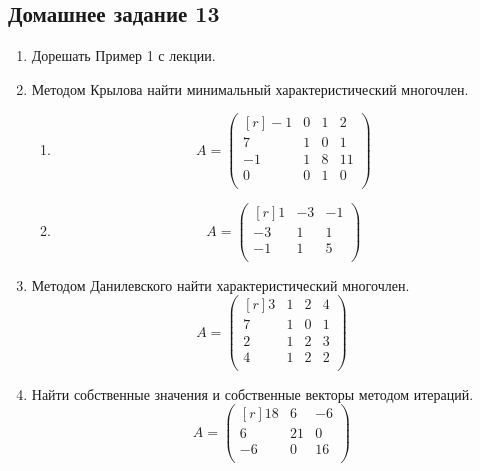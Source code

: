 \subsection{Домашнее задание 13}\begin{enumerate}
    \item Дорешать Пример 1 с лекции.
    \item Методом Крылова найти минимальный характеристический многочлен.
    \begin{enumerate}
        \item \[A = \begin{pmatrix}[r]
        -1 & 0 & 1 & 2\\
        7 & 1 & 0 & 1\\
        -1 & 1 & 8 & 11\\
        0 & 0 & 1 & 0\\
        \end{pmatrix}\]
        \item \[A = \begin{pmatrix}[r]
        1 & -3 & -1\\
        -3 & 1 & 1\\
        -1 & 1 & 5\\
        \end{pmatrix}\]
    \end{enumerate}
    \item Методом Данилевского найти характеристический многочлен.
    \[A = \begin{pmatrix}[r]
    3 & 1 & 2 & 4\\
    7 & 1 & 0 & 1\\
    2 & 1 & 2 & 3\\
    4 & 1 & 2 & 2\\
    \end{pmatrix}\]
    \item Найти собственные значения и собственные векторы методом итераций.
    \[A = \begin{pmatrix}[r]
    18 & 6 & -6\\
    6 & 21 & 0\\
    -6 & 0 & 16\\
    \end{pmatrix}\]
\end{enumerate}
